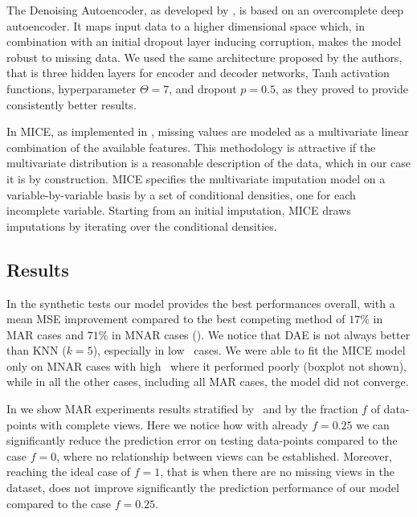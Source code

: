 The Denoising Autoencoder, as developed by \cite{dae}, is based on an overcomplete deep autoencoder.
It maps input data to a higher dimensional space which, in combination with an initial dropout layer inducing corruption, makes the model robust to missing data.
We used the same architecture proposed by the authors, that is three hidden layers for encoder and decoder networks, Tanh activation functions, hyperparameter $\Theta=7$, and dropout $p=0.5$, as they proved to provide consistently better results.

In MICE, as implemented in \cite{mice}, missing values are modeled as a multivariate linear combination of the available features.
This methodology is attractive if the multivariate distribution is a reasonable description of the data, which in our case it is by construction.
MICE specifies the multivariate imputation model on a variable-by-variable basis by a set of conditional densities, one for each incomplete variable.
Starting from an initial imputation, MICE draws imputations by iterating over the conditional densities.

\subsection{Results}


In the synthetic tests our model provides the best performances overall, with a mean MSE improvement compared to the best competing method of $17\%$ in MAR cases and $71\%$ in MNAR cases ().
We notice that DAE is not always better than KNN ($k=5$), especially in low \snr\ cases.
We were able to fit the MICE model only on MNAR cases with high \snr\, where it performed poorly (boxplot not shown), while in all the other cases, including all MAR cases, the model did not converge.

In  we show MAR experiments results stratified by \snr\ and by the fraction $f$ of data-points with complete views.
Here we notice how with already $f = 0.25$ we can significantly reduce the prediction error on testing data-points compared to the case $f=0$, where no relationship between views can be established.
Moreover, reaching the ideal case of $f=1$, that is when there are no missing views in the dataset, does not improve significantly the prediction performance of our model compared to the case $f = 0.25$.

